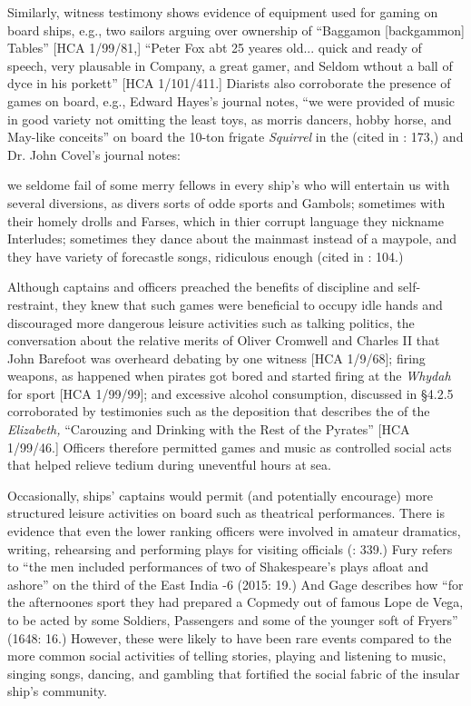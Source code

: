Similarly, witness testimony shows evidence of equipment used for gaming on board ships, e.g., two sailors arguing over ownership of “Baggamon [backgammon] Tables” [HCA 1/99/81,] “Peter Fox abt 25 yeares old... quick and ready of speech, very plausable in Company, a great gamer, and Seldom wthout a ball of dyce in his porkett” [HCA 1/101/411.] Diarists also corroborate the presence of games on board, e.g., Edward Hayes’s  journal notes, “we were provided of music in good variety not omitting the least toys, as morris dancers, hobby horse, and May-like conceits” on board the 10-ton frigate \textit{Squirrel} in the  (cited in \citealt{Bicheno2012}: 173,) and Dr. John Covel’s  journal notes:

we seldome fail of some merry fellows in every ship’s  who will entertain us with several diversions, as divers sorts of odde sports and Gambols; sometimes with their homely drolls and Farses, which in thier corrupt language they nickname Interludes; sometimes they dance about the mainmast instead of a maypole, and they have variety of forecastle songs, ridiculous enough (cited in \citealt{Palmer1986}: 104.)

Although captains and officers preached the benefits of discipline and self-restraint, they knew that such games were beneficial to occupy idle hands and discouraged more dangerous leisure activities such as talking politics, the conversation about the relative merits of Oliver Cromwell and Charles II that John Barefoot was overheard debating by one witness [HCA 1/9/68]; firing weapons, as happened when pirates got bored and started firing at the \textit{Whydah} for sport [HCA 1/99/99]; and excessive alcohol consumption, discussed in §4.2.5 corroborated by testimonies such as the deposition that describes the  of the \textit{Elizabeth,} “Carouzing and Drinking with the Rest of the Pyrates” [HCA 1/99/46.] Officers therefore permitted games and music as controlled social acts that helped relieve tedium during uneventful hours at sea. 

Occasionally, ships’ captains would permit (and potentially encourage) more structured leisure activities on board such as theatrical performances. There is evidence that even the lower ranking officers were involved in amateur dramatics, writing, rehearsing and performing plays for visiting officials (\citealt{AdkinsAdkins2008}: 339.) Fury refers to “the men included performances of two of Shakespeare’s plays afloat and ashore” on the third  of the East India \citealt{Company1604}-6 (2015: 19.) And Gage describes how “for the afternoones sport they had prepared a Copmedy out of famous Lope de Vega, to be acted by some Soldiers, Passengers and some of the younger soft of Fryers” (1648: 16.) However, these were likely to have been rare events compared to the more common social activities of telling stories, playing and listening to music, singing songs, dancing, and gambling that fortified the social fabric of the insular ship’s community. 


